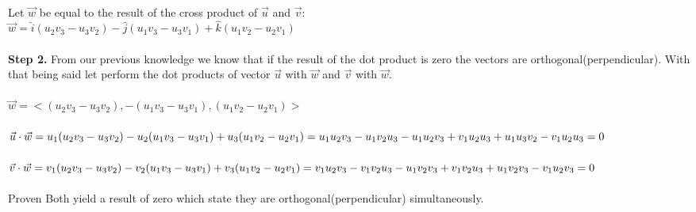 \documentclass{article}
\begin{document}
\begin{enumerate}[a.]
	\\
	Let $\vec{w}$ be equal to the result of the cross product of $\vec{u}$ and $\vec{v}$:\\
	$\vec{w} = \hat{i}(u_{2}v_{3}-u_{3}v_{2})-\hat{j}(u_{1}v_{3}-u_{3}v_{1})+\hat{k}(u_{1}v_{2}-u_{2}v_{1})$\\
	\\
	\textbf{Step 2.} From our previous knowledge we know that if the result of the dot product is zero the vectors are orthogonal(perpendicular). With that being said let perform the dot products of vector $\vec{u}$ with $\vec{w}$ and $\vec{v}$ with $\vec{w}$.\\
	\\
	$\vec{w} = <(u_{2}v_{3}-u_{3}v_{2}),-(u_{1}v_{3}-u_{3}v_{1}),(u_{1}v_{2}-u_{2}v_{1})>$\\
	\\
	$\vec{u}\cdot\vec{w}=u_{1}(u_{2}v_{3}-u_{3}v_{2})-u_{2}(u_{1}v_{3}-u_{3}v_{1})+u_{3}(u_{1}v_{2}-u_{2}v_{1})\\=u_{1}u_{2}v_{3}-u_{1}v_{2}u_{3}-u_{1}u_{2}v_{3}+v_{1}u_{2}u_{3}+u_{1}u_{3}v_{2}-v_{1}u_{2}u_{3}=0$\\
	\\ 
	$\vec{v}\cdot\vec{w}=v_{1}(u_{2}v_{3}-u_{3}v_{2})-v_{2}(u_{1}v_{3}-u_{3}v_{1})+v_{3}(u_{1}v_{2}-u_{2}v_{1})\\=v_{1}u_{2}v_{3}-v_{1}v_{2}u_{3}-u_{1}v_{2}v_{3}+v_{1}v_{2}u_{3}+u_{1}v_{2}v_{3}-v_{1}u_{2}v_{3}=0$\\
	\\
	Proven Both yield a result of zero which state they are orthogonal(perpendicular) simultaneously.
\end{enumerate}
\end{document}

